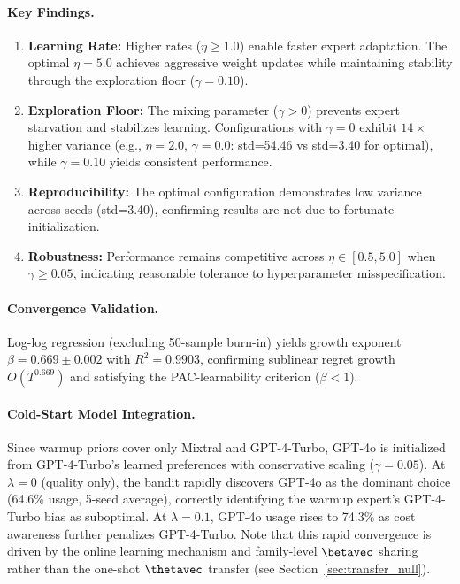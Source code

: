 \paragraph{Key Findings.}
\begin{enumerate}[nosep]
    \item \textbf{Learning Rate:} Higher rates ($\eta \geq 1.0$) enable faster expert adaptation. The optimal $\eta=5.0$ achieves aggressive weight updates while maintaining stability through the exploration floor ($\gamma=0.10$).
    
    \item \textbf{Exploration Floor:} The mixing parameter ($\gamma > 0$) prevents expert starvation and stabilizes learning. Configurations with $\gamma=0$ exhibit $14\times$ higher variance (e.g., $\eta=2.0$, $\gamma=0.0$: std=54.46 vs std=3.40 for optimal), while $\gamma=0.10$ yields consistent performance.
    
    \item \textbf{Reproducibility:} The optimal configuration demonstrates low variance across seeds (std=3.40), confirming results are not due to fortunate initialization.
    
    \item \textbf{Robustness:} Performance remains competitive across $\eta \in [0.5, 5.0]$ when $\gamma \geq 0.05$, indicating reasonable tolerance to hyperparameter misspecification.
\end{enumerate}

\paragraph{Convergence Validation.}
Log-log regression (excluding 50-sample burn-in) yields growth exponent $\beta=0.669 \pm 0.002$ with $R^2=0.9903$, confirming sublinear regret growth $O(T^{0.669})$ and satisfying the PAC-learnability criterion ($\beta < 1$).

\paragraph{Cold-Start Model Integration.}
Since warmup priors cover only Mixtral and GPT-4-Turbo, GPT-4o is initialized from GPT-4-Turbo's learned preferences with conservative scaling ($\gamma=0.05$). At $\lambda=0$ (quality only), the bandit rapidly discovers GPT-4o as the dominant choice (64.6\% usage, 5-seed average), correctly identifying the warmup expert's GPT-4-Turbo bias as suboptimal. At $\lambda=0.1$, GPT-4o usage rises to 74.3\% as cost awareness further penalizes GPT-4-Turbo. Note that this rapid convergence is driven by the online learning mechanism and family-level $\betavec$ sharing rather than the one-shot $\thetavec$ transfer (see Section~\ref{sec:transfer_null}).

